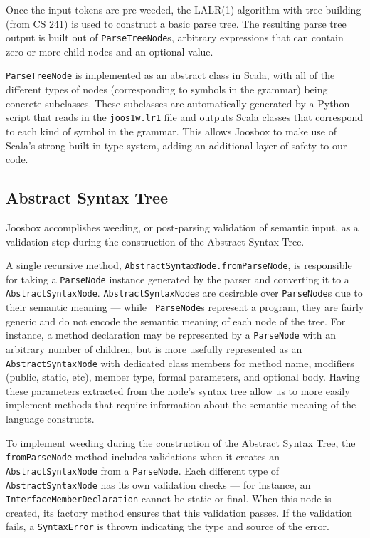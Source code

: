 \documentclass[letterpaper]{article}
\begin{document}
  Once the input tokens are pre-weeded, the LALR(1) algorithm with tree building
  (from CS 241) is used to construct a basic parse tree. The resulting parse
  tree output is built out of {\tt ParseTreeNode}s, arbitrary expressions that
  can contain zero or more child nodes and an optional value.

  {\tt ParseTreeNode} is implemented as an abstract class in Scala, with all of
  the different types of nodes (corresponding to symbols in the grammar) being
  concrete subclasses. These subclasses are automatically generated by a Python
  script that reads in the {\tt joos1w.lr1} file and outputs Scala classes that
  correspond to each kind of symbol in the grammar. This allows Joosbox to make
  use of Scala's strong built-in type system, adding an additional layer of
  safety to our code.

  \subsection{Abstract Syntax Tree}

  Joosbox accomplishes weeding, or post-parsing validation of semantic input, as
  a validation step during the construction of the Abstract Syntax Tree.

  A single recursive method, {\tt AbstractSyntaxNode.fromParseNode}, is
  responsible for taking a {\tt ParseNode} instance generated by the parser and
  converting it to a {\tt AbstractSyntaxNode}. {\tt AbstractSyntaxNode}s are
  desirable over {\tt ParseNode}s due to their semantic meaning --- while {\tt
  ParseNode}s represent a program, they are fairly generic and do not encode the
  semantic meaning of each node of the tree. For instance, a method declaration
  may be represented by a {\tt ParseNode} with an arbitrary number of children,
  but is more usefully represented as an {\tt AbstractSyntaxNode} with dedicated
  class members for method name, modifiers (public, static, etc), member type,
  formal parameters, and optional body. Having these parameters extracted from
  the node's syntax tree allow us to more easily implement methods that require
  information about the semantic meaning of the language constructs.

  To implement weeding during the construction of the Abstract Syntax Tree, the
  {\tt fromParseNode} method includes validations when it creates an {\tt
  AbstractSyntaxNode} from a {\tt ParseNode}. Each different type of {\tt
  AbstractSyntaxNode}  has its own validation checks --- for instance, an {\tt
  InterfaceMemberDeclaration} cannot be static  or final. When this node is
  created, its factory method ensures that this validation passes. If the
  validation  fails, a {\tt SyntaxError} is thrown indicating the type and
  source of the error.
\end{document}
